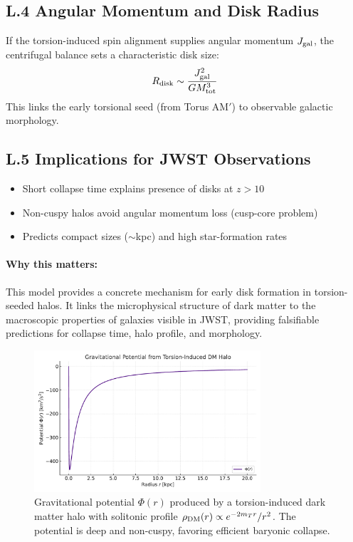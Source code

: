 \documentclass{article}
\begin{document}
\subsection*{L.4 Angular Momentum and Disk Radius}
If the torsion-induced spin alignment supplies angular momentum $J_{\rm gal}$, the centrifugal balance sets a characteristic disk size:
\begin{equation}
R_{\rm disk} \sim \frac{J_{\rm gal}^2}{G M_{\rm tot}^3}
\end{equation}
This links the early torsional seed (from Torus AM$'$) to observable galactic morphology.

\subsection*{L.5 Implications for JWST Observations}
\begin{itemize}
  \item Short collapse time explains presence of disks at $z > 10$
  \item Non-cuspy halos avoid angular momentum loss (cusp-core problem)
  \item Predicts compact sizes ($\sim$kpc) and high star-formation rates
\end{itemize}

\paragraph{Why this matters:}
This model provides a concrete mechanism for early disk formation in torsion-seeded halos. It links the microphysical structure of dark matter to the macroscopic properties of galaxies visible in JWST, providing falsifiable predictions for collapse time, halo profile, and morphology.

\begin{figure}[h!]
\centering
\includegraphics[width=0.75\textwidth]{Torsion_DM_Potential.pdf}
\caption{Gravitational potential $\Phi(r)$ produced by a torsion-induced dark matter halo with solitonic profile $\rho_{\rm DM}(r) \propto e^{-2m_T r}/r^2$. The potential is deep and non-cuspy, favoring efficient baryonic collapse.}
\label{fig:torsion_potential}
\end{figure}
\end{document}

